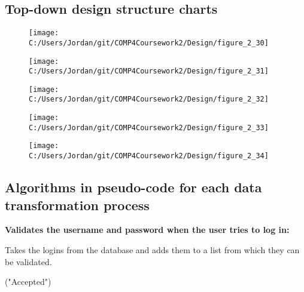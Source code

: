 \subsection{Top-down design structure charts}

\begin{figure}[H]
    \label{fig:print_function_result}\caption{}
    \texttt{[image: C:/Users/Jordan/git/COMP4Coursework2/Design/figure\_2\_30]}
\end{figure}

\begin{figure}[H]
    \label{fig:print_function_result}\caption{}
    \texttt{[image: C:/Users/Jordan/git/COMP4Coursework2/Design/figure\_2\_31]}
\end{figure}

\begin{figure}[H]
    \label{fig:print_function_result}\caption{}
    \texttt{[image: C:/Users/Jordan/git/COMP4Coursework2/Design/figure\_2\_32]}
\end{figure}

\begin{figure}[H]
    \label{fig:print_function_result}\caption{}
    \texttt{[image: C:/Users/Jordan/git/COMP4Coursework2/Design/figure\_2\_33]}
\end{figure}

\begin{figure}[H]
    \label{fig:print_function_result}\caption{}
    \texttt{[image: C:/Users/Jordan/git/COMP4Coursework2/Design/figure\_2\_34]}
\end{figure}

\subsection{Algorithms in pseudo-code for each data transformation process}

\textbf{Validates the username and password when the user tries to log in:}

\begin{algorithm}[H]
\caption{Takes the logins from the database and adds them to a list from which they can be validated.}
\begin{algorithmic}[1]
\EndFor
{}
		\SEND("Accepted")
	\Else{}
	\EndIf
\EndWhile
\end{algorithmic}
\end{algorithm}

